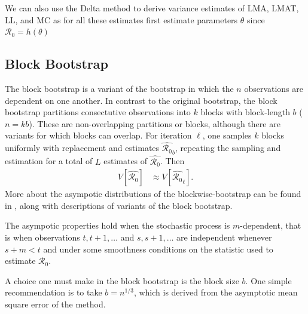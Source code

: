 \documentclass[12pt]{article}
\newcommand{\rr}{\ensuremath{\mathcal{R}_0}}
\begin{document}
We can also use the Delta method to derive variance estimates of LMA, LMAT, LL, and MC as for all these estimates first estimate parameters $\theta$ since $\rr= h(\theta)$

\subsection{Block Bootstrap}

The block bootstrap is a variant of the bootstrap in which the $n$ observations are dependent on one another.  In contrast to the original bootstrap, the block bootstrap partitions consectutive observations into $k$ blocks with block-length $b$ ($n=kb$).  These are non-overlapping partitions or blocks, although there are variants for which blocks can overlap.  For iteration $\ell$, one samples $k$ blocks uniformly with replacement and estimates $\hat{\rr}_b$, repeating the sampling and estimation for a total of $L$ estimates of $\hat{\rr}$.  Then
\begin{align*}
  V\left [ \hat{\rr} \right ] &\approx V\left [\hat{\rr}_\ell \right ].
\end{align*}
More about the asympotic distributions of the blockwise-bootstrap can be found in \cite{cao1999}, along with descriptions of variants of the block bootstrap.

The asympotic properties hold when the stochastic process is $m$-dependent, that is when observations $t, t+1, \dots$ and $s, s+1, \dots$ are independent whenever $s+m < t$ and under some smoothness conditions on the statistic used to estimate $\rr$.

A choice one must make in the block bootstrap is the block size $b$.  One simple recommendation is to take $b= n^{1/3}$, which is derived from the asymptotic mean square error of the method.
\end{document}

